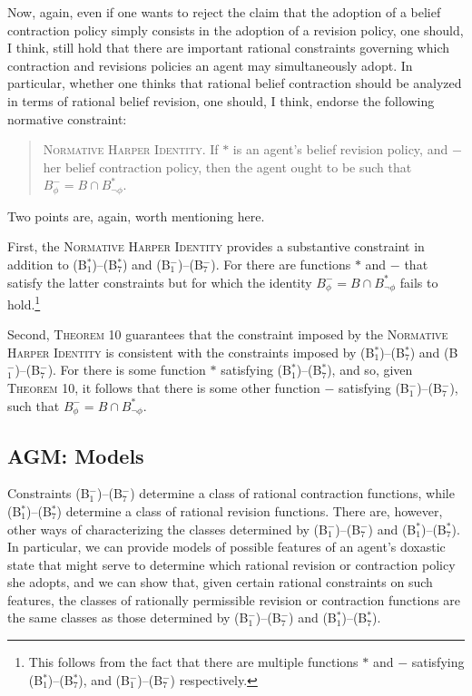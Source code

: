 Now, again, even if one wants to reject the claim that the adoption of a belief contraction policy simply consists in the adoption of a revision policy, one should, I think, still hold that there are important rational constraints governing which contraction and revisions policies an agent may simultaneously adopt.
In particular, whether one thinks that rational belief contraction should be analyzed in terms of rational belief revision, one should, I think, endorse the following normative constraint:
\begin{quote}
\textsc{Normative Harper Identity.}\; If $*$ is an agent's belief revision policy, and $-$  her belief contraction policy, then the agent ought to be such that $B^-_\phi = B \cap B^*_{\lnot \phi}$.
\end{quote}

Two points are, again, worth mentioning here.

First, the \textsc{Normative Harper Identity} provides a substantive constraint in addition to (B$^*_1$)--(B$^*_7$) and (B$^-_1$)--(B$^-_7$).
For there are functions $*$ and $-$ that satisfy the latter constraints but for which the identity $B^-_\phi = B \cap B^*_{\lnot \phi}$ fails to hold.\footnote{This follows from the fact that there are multiple functions $*$ and $-$ satisfying (B$^*_1$)--(B$^*_7$), and (B$^-_1$)--(B$^-_7$) respectively.}

Second, \textsc{Theorem 10} guarantees that the constraint imposed by the \textsc{Normative Harper Identity} is consistent with the constraints imposed by (B$^*_1$)--(B$^*_7$) and (B$^-_1$)--(B$^-_7$).
For there is some function $*$ satisfying (B$^*_1$)--(B$^*_7$), and so, given \textsc{Theorem 10}, it follows that there is some other function $-$ satisfying (B$^-_1$)--(B$^-_7$), such that $B^-_\phi = B \cap B^*_{\lnot \phi}$.


\subsection{AGM: Models}\label{caie-section2-3}


Constraints (B$^-_1$)--(B$^-_7$) determine a class of rational contraction functions, while (B$^*_1$)--(B$^*_7$) determine a class of rational revision functions.
There are, however, other ways of characterizing the classes determined by (B$^-_1$)--(B$^-_7$)  and (B$^*_1$)--(B$^*_7$).
In particular, we can provide models of possible features of an agent's doxastic state that might serve to determine which rational revision or contraction policy she adopts, and we can show that, given certain rational constraints on such features, the classes of rationally permissible revision or contraction functions are the same classes as those determined by (B$^-_1$)--(B$^-_7$) and (B$^*_1$)--(B$^*_7$).


